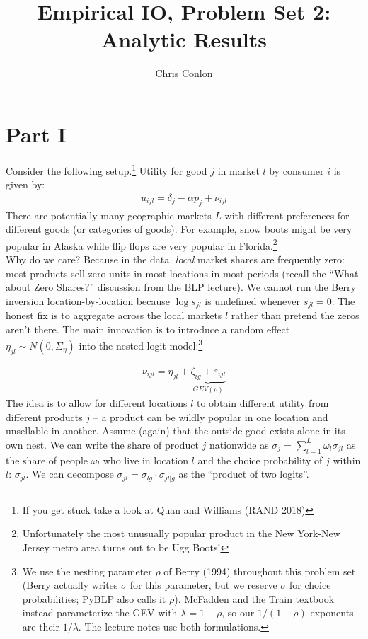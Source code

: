 \documentclass[12pt]{article}
\begin{document}
\title{Empirical IO, Problem Set 2: \\
Analytic Results}
\author{Chris Conlon}
\date{}
\maketitle

\section*{\normalsize Part I}
Consider the following setup.\footnote{If you get stuck take a look at Quan and Williams (RAND 2018)} Utility for good $j$ in market $l$ by consumer $i$ is given by:
\begin{eqnarray*}
u_{ijl} = \delta_j - \alpha p_j + \nu_{ijl}
\end{eqnarray*}
There are potentially many geographic markets $L$ with different preferences for different goods (or categories of goods). For example, snow boots might be very popular in Alaska while flip flops are very popular in Florida.\footnote{Unfortunately the most unusually popular product in the New York-New Jersey metro area turns out to be Ugg Boots!}\\

\noindent Why do we care? Because in the data, \textit{local} market shares are frequently zero: most products sell zero units in most locations in most periods (recall the ``What about Zero Shares?'' discussion from the BLP lecture). We cannot run the Berry inversion location-by-location because $\log s_{jl}$ is undefined whenever $s_{jl} = 0$. The honest fix is to aggregate across the local markets $l$ rather than pretend the zeros aren't there. The main innovation is to introduce a random effect $\eta_{jl} \sim N(0,\Sigma_{\eta})$ into the nested logit model:\footnote{We use the nesting parameter $\rho$ of Berry (1994) throughout this problem set (Berry actually writes $\sigma$ for this parameter, but we reserve $\sigma$ for choice probabilities; PyBLP also calls it $\rho$). McFadden and the Train textbook instead parameterize the GEV with $\lambda = 1-\rho$, so our $1/(1-\rho)$ exponents are their $1/\lambda$. The lecture notes use both formulations.}

\begin{eqnarray*}
\nu_{ijl} = \eta_{jl}+ \underbrace{\zeta_{ig} + \varepsilon_{ijl}}_{GEV(\rho)}
\end{eqnarray*}
The idea is to allow for different locations $l$ to obtain different utility from different products $j$ -- a product can be wildly popular in one location and unsellable in another. Assume (again) that the outside good exists alone in its own nest. We can write the share of product $j$ nationwide as $\sigma_j = \sum_{l=1}^L \omega_l \sigma_{jl}$ as the share of people $\omega_l$ who live in location $l$ and the choice probability of $j$ within $l$: $\sigma_{jl}$. We can decompose $\sigma_{jl} =  \sigma_{lg} \cdot \sigma_{jl|g}$ as the ``product of two logits''.\\
\end{document}
